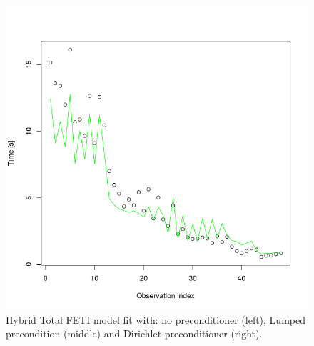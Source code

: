 \begin{figure}[htb]
\begin{minipage}{0.3\textwidth}
\end{minipage}
\begin{minipage}{0.3\textwidth}
\includegraphics[width=\textwidth]{figures/htfeti-dirichlet.png}
\end{minipage}
\caption{Hybrid Total FETI model fit with: no preconditioner (left), Lumped precondition (middle) and Dirichlet preconditioner (right).}
\label{fig:finalHTFETIModel}
\end{figure}